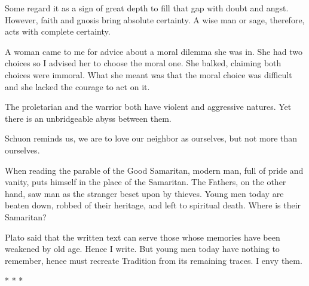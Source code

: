 Some regard it as a sign of great depth to fill that gap with doubt and angst. However, faith and gnosis bring absolute certainty. A wise man or sage, therefore, acts with complete certainty.

A woman came to me for advice about a moral dilemma she was in. She had two choices so I advised her to choose the moral one. She balked, claiming both choices were immoral. What she meant was that the moral choice was difficult and she lacked the courage to act on it.

The proletarian and the warrior both have violent and aggressive natures. Yet there is an unbridgeable abyss between them.

Schuon reminds us, we are to love our neighbor as ourselves, but not more than ourselves.

When reading the parable of the Good Samaritan, modern man, full of pride and vanity, puts himself in the place of the Samaritan. The Fathers, on the other hand, saw man as the stranger beset upon by thieves. Young men today are beaten down, robbed of their heritage, and left to spiritual death. Where is their Samaritan?

Plato said that the written text can serve those whose memories have been weakened by old age. Hence I write. But young men today have nothing to remember, hence must recreate Tradition from its remaining traces. I envy them.



\begin{center}* * *\end{center}

